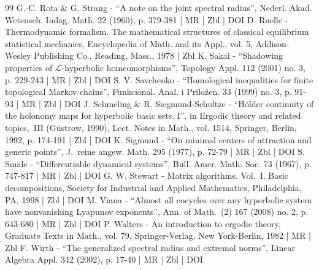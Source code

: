 \documentclass[10pt]{amsart}
\let\mathcal\mathscr
\theoremstyle{plain}
\theoremstyle{definition}
\begin{document}
\begin{thebibliography}{99}
G.-C. Rota \& G. Strang - “A note on the joint spectral radius”, Nederl. Akad. Wetensch. Indag. Math. 22 (1960), p. 379-381 | MR | Zbl | DOI
D. Ruelle - Thermodynamic formalism. The mathematical structures of classical equilibrium statistical mechanics, Encyclopedia of Math. and its Appl., vol. 5, Addison-Wesley Publishing Co., Reading, Mass., 1978 | Zbl
K. Sakai - “Shadowing properties of $\mathcal{L}$-hyperbolic homeomorphisms”, Topology Appl. 112 (2001) no. 3, p. 229-243 | MR | Zbl | DOI
S. V. Savchenko - “Homological inequalities for finite topological Markov chains”, Funkcional. Anal. i Priložen. 33 (1999) no. 3, p. 91-93 | MR | Zbl | DOI
J. Schmeling \& R. Siegmund-Schultze - “Hölder continuity of the holonomy maps for hyperbolic basic sets. I”, in Ergodic theory and related topics, III (Güstrow, 1990), Lect. Notes in Math., vol. 1514, Springer, Berlin, 1992, p. 174-191 | Zbl | DOI
K. Sigmund - “On minimal centers of attraction and generic points”, J. reine angew. Math. 295 (1977), p. 72-79 | MR | Zbl | DOI
S. Smale - “Differentiable dynamical systems”, Bull. Amer. Math. Soc. 73 (1967), p. 747-817 | MR | Zbl | DOI
G. W. Stewart - Matrix algorithms. Vol. I. Basic decompositions, Society for Industrial and Applied Mathematics, Philadelphia, PA, 1998 | Zbl | DOI
M. Viana - “Almost all cocycles over any hyperbolic system have nonvanishing Lyapunov exponents”, Ann. of Math. (2) 167 (2008) no. 2, p. 643-680 | MR | Zbl | DOI
P. Walters - An introduction to ergodic theory, Graduate Texts in Math., vol. 79, Springer-Verlag, New York-Berlin, 1982 | MR | Zbl
F. Wirth - “The generalized spectral radius and extremal norms”, Linear Algebra Appl. 342 (2002), p. 17-40 | MR | Zbl | DOI
\end{thebibliography}
\end{document}
